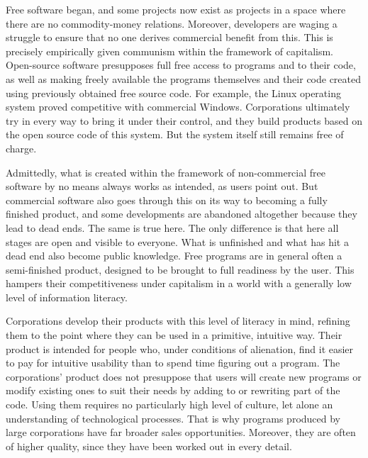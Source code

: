 \documentclass[12pt,a4paper,openany]{book}
\begin{document}
Free software began, and some projects now exist as projects in a space where there are no commodity-money relations. Moreover, developers are waging a struggle to ensure that no one derives commercial benefit from this. This is precisely empirically given communism within the framework of capitalism. Open-source software presupposes full free access to programs and to their code, as well as making freely available the programs themselves and their code created using previously obtained free source code. For example, the Linux operating system proved competitive with commercial Windows. Corporations ultimately try in every way to bring it under their control, and they build products based on the open source code of this system. But the system itself still remains free of charge.

Admittedly, what is created within the framework of non-commercial free software by no means always works as intended, as users point out. But commercial software also goes through this on its way to becoming a fully finished product, and some developments are abandoned altogether because they lead to dead ends. The same is true here. The only difference is that here all stages are open and visible to everyone. What is unfinished and what has hit a dead end also become public knowledge. Free programs are in general often a semi-finished product, designed to be brought to full readiness by the user. This hampers their competitiveness under capitalism in a world with a generally low level of information literacy.

Corporations develop their products with this level of literacy in mind, refining them to the point where they can be used in a primitive, intuitive way. Their product is intended for people who, under conditions of alienation, find it easier to pay for intuitive usability than to spend time figuring out a program. The corporations' product does not presuppose that users will create new programs or modify existing ones to suit their needs by adding to or rewriting part of the code. Using them requires no particularly high level of culture, let alone an understanding of technological processes. That is why programs produced by large corporations have far broader sales opportunities. Moreover, they are often of higher quality, since they have been worked out in every detail.
\end{document}
